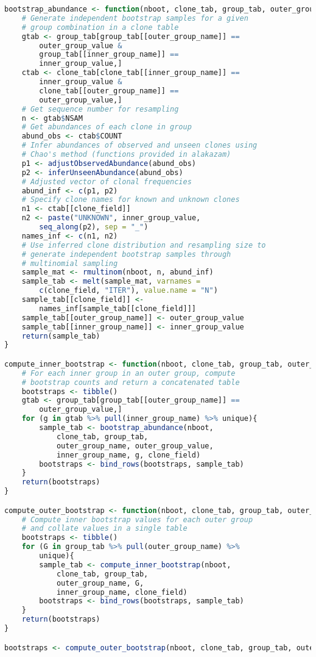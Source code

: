 \begin{lstlisting}[language=R]
bootstrap_abundance <- function(nboot, clone_tab, group_tab, outer_group_name, outer_group_value, inner_group_name, inner_group_value, clone_field){
	# Generate independent bootstrap samples for a given
	# group combination in a clone table
	gtab <- group_tab[group_tab[[outer_group_name]] == 
		outer_group_value & 
		group_tab[[inner_group_name]] == 
		inner_group_value,]
	ctab <- clone_tab[clone_tab[[inner_group_name]] == 
		inner_group_value & 
		clone_tab[[outer_group_name]] == 
		outer_group_value,]
	# Get sequence number for resampling
	n <- gtab$NSAM
	# Get abundances of each clone in group
	abund_obs <- ctab$COUNT
	# Infer abundances of observed and unseen clones using
	# Chao's method (functions provided in alakazam)
	p1 <- adjustObservedAbundance(abund_obs)
	p2 <- inferUnseenAbundance(abund_obs)
	# Adjusted vector of clonal frequencies
	abund_inf <- c(p1, p2)
	# Specify clone names for known and unknown clones
	n1 <- ctab[[clone_field]]
	n2 <- paste("UNKNOWN", inner_group_value,
		seq_along(p2), sep = "_")
	names_inf <- c(n1, n2)
	# Use inferred clone distribution and resampling size to 
	# generate independent bootstrap samples through
	# multinomial sampling
	sample_mat <- rmultinom(nboot, n, abund_inf)
	sample_tab <- melt(sample_mat, varnames = 
		c(clone_field, "ITER"), value.name = "N")
	sample_tab[[clone_field]] <- 
		names_inf[sample_tab[[clone_field]]]
	sample_tab[[outer_group_name]] <- outer_group_value
	sample_tab[[inner_group_name]] <- inner_group_value
	return(sample_tab)
}

compute_inner_bootstrap <- function(nboot, clone_tab, group_tab, outer_group_name, outer_group_value, inner_group_name, clone_field){
	# For each inner group in an outer group, compute
	# bootstrap counts and return a concatenated table
	bootstraps <- tibble()
	gtab <- group_tab[group_tab[[outer_group_name]] == 
		outer_group_value,]
	for (g in gtab %>% pull(inner_group_name) %>% unique){
		sample_tab <- bootstrap_abundance(nboot, 
			clone_tab, group_tab, 
			outer_group_name, outer_group_value, 
			inner_group_name, g, clone_field)
		bootstraps <- bind_rows(bootstraps, sample_tab)
	}
	return(bootstraps)
}

compute_outer_bootstrap <- function(nboot, clone_tab, group_tab, outer_group_name, inner_group_name, clone_field){
	# Compute inner bootstrap values for each outer group
	# and collate values in a single table
	bootstraps <- tibble()
	for (G in group_tab %>% pull(outer_group_name) %>% 
		unique){
		sample_tab <- compute_inner_bootstrap(nboot, 
			clone_tab, group_tab, 
			outer_group_name, G,
			inner_group_name, clone_field)
		bootstraps <- bind_rows(bootstraps, sample_tab)
	}
	return(bootstraps)
}

bootstraps <- compute_outer_bootstrap(nboot, clone_tab, group_tab, outer_group, clone_field)
\end{lstlisting}

